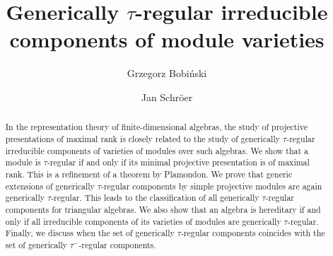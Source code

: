 \documentclass[12pt,reqno]{amsart}
\theoremstyle{definition}
\begin{document}



\title{Generically $\tau$-regular irreducible components of module varieties}


\author{Grzegorz Bobi\'nski}
\address{Grzegorz Bobi\'nski\newline
Faculty of Mathematics and Computer Science\newline
Nicolaus Copernicus University\newline
ul. Chopina 12/18-100 Toru\'n\newline
Poland}

\author{Jan Schr\"oer}
\address{Jan Schr\"oer\newline
Mathematisches Institut\newline
Universit\"at Bonn\newline
Endenicher Allee 60 Bonn\newline
Germany}




\begin{abstract}
In the representation theory of finite-dimensional algebras,
the study of projective presentations of maximal rank is closely related
to the study of generically $\tau$-regular irreducible components of
varieties of modules over such algebras.
We show that a module is $\tau$-regular if and only if
its minimal projective presentation is of maximal rank.
This is a refinement of a theorem by Plamondon.
We prove that generic extensions of generically $\tau$-regular components by simple projective modules are
again generically $\tau$-regular.
This leads to the classification of all generically $\tau$-regular components for triangular algebras.
We also show that an algebra is hereditary if and only if
all irreducible components of its varieties of modules are generically
$\tau$-regular.
Finally, we discuss when the set of generically $\tau$-regular
components coincides with the set of generically $\tau^-$-regular
components.
\end{abstract}


\maketitle
\end{document}
